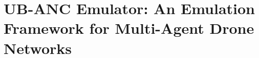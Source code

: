 \chapter{UB-ANC Emulator: An Emulation Framework for Multi-Agent Drone Networks}\label{chap:emul}



